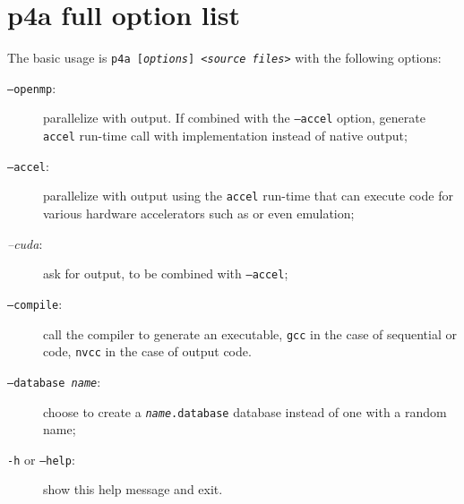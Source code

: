 \documentclass[a4paper]{article}
\begin{document}
\section{p4a full option list}
\label{sec:options}

The basic usage is \texttt{p4a [\emph{options}] <\emph{source files}>}
with the following options:
\begin{description}
\item[\texttt{--openmp}:] parallelize with \Aopenmp output. If combined
  with the \texttt{--accel} option, generate \Apfa \texttt{accel} run-time
  call with \Aopenmp implementation instead of native \Aopenmp output;

\item[\texttt{--accel}:] parallelize with output using the \Apfa
  \texttt{accel} run-time that can execute code for various
  hardware accelerators such as \Agpu or even \Aopenmp emulation;

\item[\emph{--cuda}:] ask for \Acuda output, to be combined with
  \texttt{--accel};

\item[\texttt{--compile}:] call the compiler to generate an executable,
  \texttt{gcc} in the case of sequential or \Aopenmp code, \texttt{nvcc}
  in the case of \Acuda output code.

\item[\texttt{--database \emph{name}}:] choose to create a
  \texttt{\emph{name}.database} database instead of one with a random name;

\item[\texttt{-h} or \texttt{--help}:] show this help message and exit.
\end{description}



\end{document}
